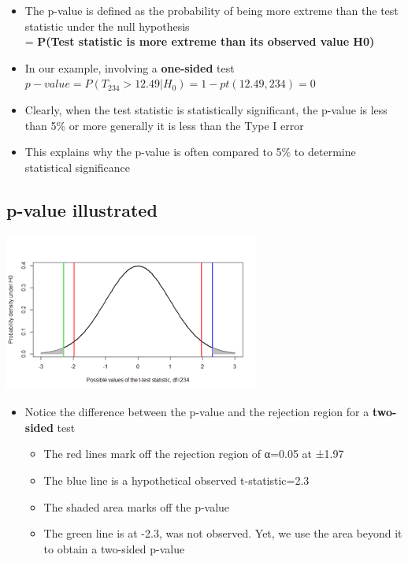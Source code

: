 \documentclass[
]{book}
\providecommand{\tightlist}{%
  \setlength{\itemsep}{0pt}\setlength{\parskip}{0pt}}
\begin{document}
\begin{itemize}
\tightlist
\item
  The p-value is defined as the probability of being more extreme than the test statistic under the null hypothesis\\
  = \textbf{P(Test statistic is more extreme than its observed value \textbar{} H0)}
\item
  In our example, involving a \textbf{one-sided} test\\
  \(p-value = P(T_{234} > 12.49 |H_0) = 1-pt(12.49,234) = 0\)
\item
  Clearly, when the test statistic is statistically significant, the p-value is less than 5\% or more generally it is less than the Type I error
\item
  This explains why the p-value is often compared to 5\% to determine statistical significance
\end{itemize}

\hypertarget{p-value-illustrated}{%
\subsection{p-value illustrated}\label{p-value-illustrated}}

\includegraphics[width=0.5\linewidth]{./4_26}

\begin{itemize}
\tightlist
\item
  Notice the difference between the p-value and the rejection region for a \textbf{two-sided} test

  \begin{itemize}
  \tightlist
  \item
    The red lines mark off the rejection region of α=0.05 at ±1.97
  \item
    The blue line is a hypothetical observed t-statistic=2.3
  \item
    The shaded area marks off the p-value
  \item
    The green line is at -2.3, was not observed. Yet, we use the area beyond it to obtain a two-sided p-value
  \end{itemize}
\end{itemize}
\end{document}
